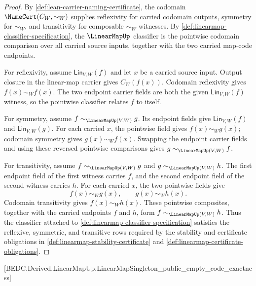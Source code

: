 \begin{proof}
By \autoref{def:lean-carrier-naming-certificate}, the codomain $\NameCert(C_W,\sim_W)$ supplies reflexivity for carried codomain outputs, symmetry for $\sim_W$, and transitivity for composable $\sim_W$ witnesses. By \autoref{def:linearmap-classifier-specification}, the $\LinearMapUp$ classifier is the pointwise codomain comparison over all carried source inputs, together with the two carried map-code endpoints.

For reflexivity, assume $\mathsf{Lin}_{V,W}(f)$ and let $x$ be a carried source input. Output closure in the linear-map carrier gives $C_W(f(x))$. Codomain reflexivity gives $f(x)\sim_W f(x)$. The two endpoint carrier fields are both the given $\mathsf{Lin}_{V,W}(f)$ witness, so the pointwise classifier relates $f$ to itself.

For symmetry, assume $f\sim_{\LinearMapUp(V,W)}g$. Its endpoint fields give $\mathsf{Lin}_{V,W}(f)$ and $\mathsf{Lin}_{V,W}(g)$. For each carried $x$, the pointwise field gives $f(x)\sim_W g(x)$; codomain symmetry gives $g(x)\sim_W f(x)$. Swapping the endpoint carrier fields and using these reversed pointwise comparisons gives $g\sim_{\LinearMapUp(V,W)}f$.

For transitivity, assume $f\sim_{\LinearMapUp(V,W)}g$ and $g\sim_{\LinearMapUp(V,W)}h$. The first endpoint field of the first witness carries $f$, and the second endpoint field of the second witness carries $h$. For each carried $x$, the two pointwise fields give
$$
f(x)\sim_W g(x),
\qquad
g(x)\sim_W h(x).
$$
Codomain transitivity gives $f(x)\sim_W h(x)$. These pointwise composites, together with the carried endpoints $f$ and $h$, form $f\sim_{\LinearMapUp(V,W)}h$. Thus the classifier attached to \autoref{def:linearmap-classifier-specification} satisfies the reflexive, symmetric, and transitive rows required by the stability and certificate obligations in \autoref{def:linearmap-stability-certificate} and \autoref{def:linearmap-certificate-obligations}.
\end{proof}

[BEDC.Derived.LinearMapUp.LinearMapSingleton\_public\_empty\_code\_exactness]

